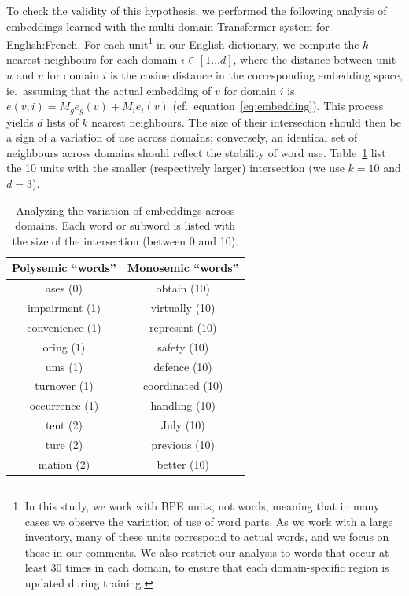 \documentclass[11pt,a4paper]{article}
\begin{document}
To check the validity of this hypothesis, we performed the following analysis of embeddings learned with the multi-domain Transformer system for English:French. For each unit\footnote{In this study, we work with BPE units, not words, meaning that in many cases we observe the variation of use of word parts. As we work with a large inventory, many of these units correspond to actual words, and we focus on these in our comments. We also restrict our analysis to words that occur at least 30 times in each domain, to ensure that each domain-specific region is updated during training.} in our English dictionary, we compute the $k$ nearest neighbours for each domain $i \in [1\dots{}d]$, where the distance between unit $u$ and $v$ for domain $i$ is the cosine distance in the corresponding embedding space, ie.\ assuming that the actual embedding of $v$ for domain $i$ is $e(v,i) = M_ge_g(v) + M_ie_i(v)$ (cf.\ equation~\eqref{eq:embedding}). This process yields $d$ lists of $k$ nearest neighbours. The size of their intersection should then be a sign of a variation of use across domains; conversely, an identical set of neighbours across domains should reflect the stability of word use. Table~\ref{tab:embeddings} list the 10 units with the smaller (respectively larger) intersection (we use $k=10$ and $d=3$). 

\begin{table}
  \centering
  \begin{tabularx}{1.0\linewidth}{c|c}
    Polysemic ``words'' & Monosemic ``words'' \\ \hline
     ases (0) &               obtain (10) \\       
     impairment (1) &     virtually (10) \\    
     convenience (1) &    represent (10) \\    
     oring (1) &              safety (10) \\       
     ums (1) &               defence (10) \\      
     turnover (1) &         coordinated (10) \\  
     occurrence (1) &     handling (10) \\     
     tent (2) &               July (10) \\         
     ture (2) &               previous (10) \\     
     mation (2) &           better (10) \\ \hline
  \end{tabularx}
  \caption{Analyzing the variation of embeddings across domains. Each word or subword is listed with the size of the intersection (between 0 and 10).}
  \label{tab:embeddings}
\end{table}
\end{document}
